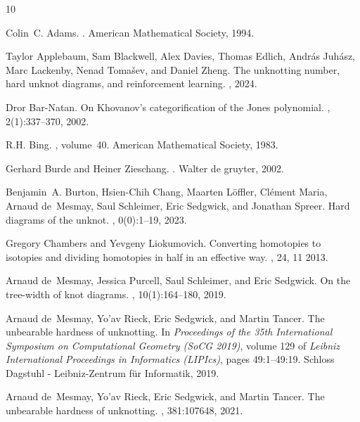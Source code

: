 \documentclass[10pt,a4paper]{amsart}
\begin{document}
\begin{thebibliography}{10}

Colin~C. Adams.
.
\newblock American Mathematical Society, 1994.

Taylor Applebaum, Sam Blackwell, Alex Davies, Thomas Edlich, Andr{\'a}s
  Juh{\'a}sz, Marc Lackenby, Nenad Toma{\v{s}}ev, and Daniel Zheng.
\newblock The unknotting number, hard unknot diagrams, and reinforcement
  learning.
, 2024.

Dror Bar-Natan.
\newblock On {K}hovanov\textquoteright{}s categorification of the {J}ones polynomial.
, 2(1):337--370, 2002.

R.H. Bing.
, volume~40.
\newblock American Mathematical Society, 1983.

Gerhard Burde and Heiner Zieschang.
.
\newblock Walter de gruyter, 2002.

Benjamin~A. Burton, Hsien-Chih Chang, Maarten Löffler, Clément Maria, Arnaud
  de~Mesmay, Saul Schleimer, Eric Sedgwick, and Jonathan Spreer.
\newblock Hard diagrams of the unknot.
, 0(0):1--19, 2023.

Gregory Chambers and Yevgeny Liokumovich.
\newblock Converting homotopies to isotopies and dividing homotopies in half in
  an effective way.
, 24, 11 2013.

Arnaud de~Mesmay, Jessica Purcell, Saul Schleimer, and Eric Sedgwick.
\newblock On the tree-width of knot diagrams.
, 10(1):164--180, 2019.

Arnaud de~Mesmay, Yo'av Rieck, Eric Sedgwick, and Martin Tancer.
\newblock The unbearable hardness of unknotting.
\newblock In {\em Proceedings of the 35th International Symposium on
  Computational Geometry (SoCG 2019)}, volume 129 of {\em Leibniz International
  Proceedings in Informatics (LIPIcs)}, pages 49:1--49:19. Schloss Dagstuhl -
  Leibniz-Zentrum f{\"{u}}r Informatik, 2019.

Arnaud de~Mesmay, Yo'av Rieck, Eric Sedgwick, and Martin Tancer.
\newblock The unbearable hardness of unknotting.
, 381:107648, 2021.


\end{thebibliography}
\end{document}
